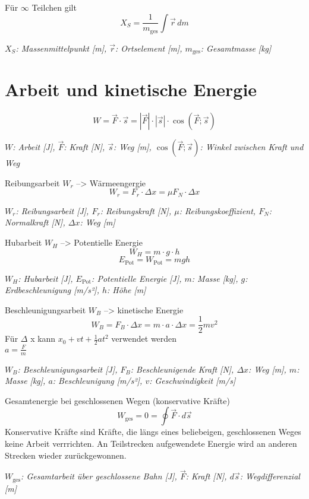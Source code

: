 \documentclass[a4paper,10pt]{article}
\newenvironment{displayformula}
{
	\begin{framed}
		\color{formulaColor}
	}
	{\end{framed}}
\newcommand{\formulalegend}[1]{%
	\par\vspace{0.5ex}%
	{{\color{legendColor}\RaggedRight\small\textit{#1}}}%
	\par\vspace{1.5ex}%
}
\begin{document}
\begin{displayformula}
	Für \( \infty \) Teilchen gilt
	\[
	X_S = \frac{1}{m_{\text{ges}}} \int \vec{r} \, dm
	\]
\end{displayformula}
\formulalegend{
	\( X_S \): Massenmittelpunkt [m], \( \vec{r} \): Ortselement [m], \( m_{\text{ges}} \): Gesamtmasse [kg]
}



\section{Arbeit und kinetische Energie}

\begin{displayformula}
	\[
	W = \vec{F} \cdot \vec{s} = |\vec{F}| \cdot |\vec{s}| \cdot \cos(\vec{F}; \vec{s})
	\]
\end{displayformula}
\formulalegend{
	\( W \): Arbeit [J], \( \vec{F} \): Kraft [N], \( \vec{s} \): Weg [m], \( \cos(\vec{F}; \vec{s}) \): Winkel zwischen Kraft und Weg
}

\begin{displayformula}
	Reibungsarbeit \( W_r \) --> Wärmeengergie
	\[
	W_r = F_r \cdot \Delta x = \mu F_N \cdot \Delta x
	\]
\end{displayformula}
\formulalegend{
	\( W_r \): Reibungsarbeit [J], \( F_r \): Reibungskraft [N], \( \mu \): Reibungskoeffizient, \( F_N \): Normalkraft [N], \( \Delta x \): Weg [m]
}

\begin{displayformula}
	Hubarbeit \( W_H \) --> Potentielle Energie
	\[
	W_H = m \cdot g \cdot h
	\]
	\[
	E_{\text{Pot}} = W_{\text{Pot}} = mgh
	\]
\end{displayformula}
\formulalegend{
	\( W_H \): Hubarbeit [J], \( E_{\text{Pot}} \): Potentielle Energie [J], \( m \): Masse [kg], \( g \): Erdbeschleunigung [m/s²], \( h \): Höhe [m]
}

\begin{displayformula}
	Beschleunigungsarbeit \( W_B \) --> kinetische Energie
	\[
	W_B = F_B \cdot \Delta x = m \cdot a \cdot \Delta x = \frac{1}{2} mv^2
	\]
	Für $\Delta$ x kann $x_0 + vt + \frac{1}{2} at^2$ verwendet werden \\
	$a = \frac{F}{m}$
\end{displayformula}
\formulalegend{
	\( W_B \): Beschleunigungsarbeit [J], \( F_B \): Beschleunigende Kraft [N], \( \Delta x \): Weg [m], \( m \): Masse [kg], \( a \): Beschleunigung [m/s²], \( v \): Geschwindigkeit [m/s]
}

\begin{displayformula}
	Gesamtenergie bei geschlossenen Wegen (konservative Kräfte)
	\[
	W_{\text{ges}} = 0 = \oint \vec{F} \cdot d\vec{s}
	\]
	Konservative Kräfte sind Kräfte, die längs eines beliebeigen, geschlossenen Weges keine Arbeit verrrichten. An Teilstrecken aufgewendete Energie wird an anderen Strecken wieder zurückgewonnen.
\end{displayformula}
\formulalegend{
	\( W_{\text{ges}} \): Gesamtarbeit über geschlossene Bahn [J], \( \vec{F} \): Kraft [N], \( d\vec{s} \): Wegdifferenzial [m]
}
\end{document}
